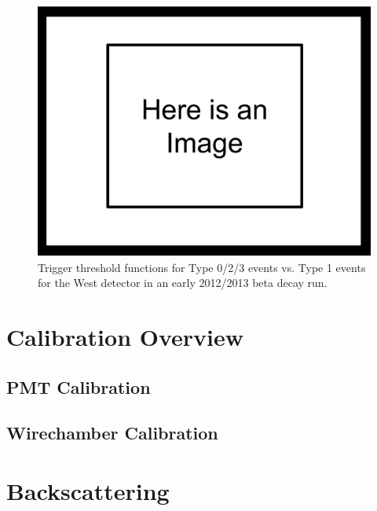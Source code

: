 \begin{figure}[h] \label{fig:evtTypeTriggers}
\centering
\includegraphics[scale=.25]{3-UCNAAnalysis/ImageHolder.pdf}
\caption{Trigger threshold functions for Type 0/2/3 events vs. Type 1 events for the 
West detector in an early 2012/2013 beta decay run. }
\end{figure}



\section{Calibration Overview}

\subsection{PMT Calibration}

\subsection{Wirechamber Calibration}

 
\section{Backscattering} \label{sec:backscattering}


